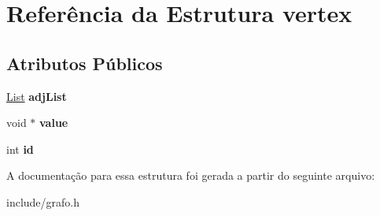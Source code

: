 \hypertarget{structvertex}{}\section{Referência da Estrutura vertex}
\label{structvertex}
\subsection*{Atributos Públicos}
\begin{DoxyCompactItemize}
\item 
\mbox{\label{structvertex_a30d637066c3489c97598af69394d187e}} 
\hyperlink{lista_8h_a698ff83165b8296011a50bb9aba83964}{List} {\bfseries adj\+List}
\item 
\mbox{\label{structvertex_aa610e7fdb75c270e113b935187b31276}} 
void $\ast$ {\bfseries value}
\item 
\mbox{\label{structvertex_a174bbdee712ca98fb591504ce66ed006}} 
int {\bfseries id}
\end{DoxyCompactItemize}


A documentação para essa estrutura foi gerada a partir do seguinte arquivo\+:\begin{DoxyCompactItemize}
\item 
include/grafo.\+h\end{DoxyCompactItemize}
